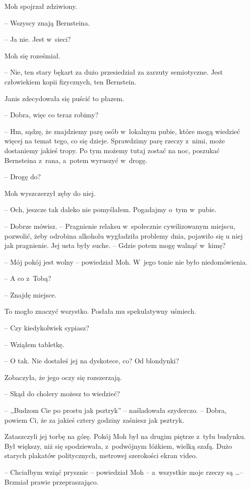 \documentclass[oneside,polish,11pt,sfheadings]{mwbk}
\begin{document}
Moh spojrzał zdziwiony. 

-- Wszyscy znają Bernsteina.

-- Ja nie. Jest w~sieci?

Moh się roześmiał. 


-- Nie, ten stary bękart za dużo przesiedział za
zarzuty semiotyczne. Jest człowiekiem kopii fizycznych, ten Bernstein.

Janis zdecydowała się puścić to płazem.

-- Dobra, więc co teraz robimy?

-- Hm, sądzę, że znajdziemy parę osób w~lokalnym pubie, które mogą
wiedzieć więcej na temat tego, co się dzieje. Sprawdzimy parę rzeczy z~nimi, może dostaniemy jakieś tropy. Po tym możemy tutaj zostać na noc,
poszukać Bernsteina z~rana, a~potem wyruszyć w~drogę.

-- Drogę do?

Moh wyszczerzył zęby do niej. 

-- Och, jeszcze tak daleko nie pomyślałem.
Pogadajmy o~tym w~pubie.

-- Dobrze mówisz. -- Pragnienie relaksu w~społecznie cywilizowanym
miejscu, pozwolić, żeby odrobina alkoholu wygładziła problemy dnia,
pojawiło się u niej jak pragnienie. Jej usta były suche. -- Gdzie potem
mogę walnąć w~kimę?

-- Mój pokój jest wolny -- powiedział Moh. W~jego tonie nie było
niedomówienia.

-- A co z~Tobą?

-- Znajdę miejsce.

To mogło znaczyć wszystko. Posłała mu spekulatywny uśmiech. 

-- Czy
kiedykolwiek sypiasz?

-- Wziąłem tabletkę.

-- O tak. Nie dostałeś jej na dyskotece, co? Od blondynki?

Zobaczyła, że jego oczy się rozszerzają. 

-- Skąd do cholery możesz to
wiedzieć?

-- ,,Budzom Cie po prostu jak psztryk'' -- naśladowała szyderczo. -- Dobra,
powiem Ci, że za jakieś cztery godziny zaśniesz jak psztryk.

Zataszczyli jej torbę na górę. Pokój Moh był na drugim piętrze z~tyłu
budynku. Był większy, niż się spodziewała, z~podwójnym łóżkiem, wielką
szafą. Dużo starych plakatów politycznych, metrowej szerokości ekran
video.

-- Chciałbym wziąć prysznic -- powiedział Moh -- a~wszystkie moje rzeczy są
\ldots -- Brzmiał prawie przepraszająco.
\end{document}
